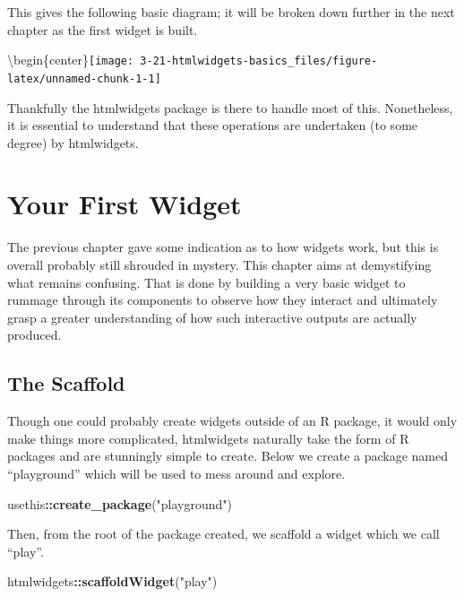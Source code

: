 \documentclass[
]{krantz}
\makeatletter
\newenvironment{Shaded}{\begin{snugshade}}{\end{snugshade}}
\newcommand{\KeywordTok}[1]{\textcolor[rgb]{0.27,0.27,0.27}{\textbf{#1}}}
\newcommand{\NormalTok}[1]{#1}
\newcommand{\OperatorTok}[1]{\textcolor[rgb]{0.43,0.43,0.43}{\textbf{#1}}}
\newcommand{\StringTok}[1]{\textcolor[rgb]{0.5,0.5,0.5}{#1}}
\newenvironment{kframe}{%
\medskip{}
\setlength{\fboxsep}{.8em}
 \def\at@end@of@kframe{}%
 \ifinner\ifhmode%
  \def\at@end@of@kframe{\end{minipage}}%
  \begin{minipage}{\columnwidth}%
 \fi\fi%
 \def\FrameCommand##1{\hskip\@totalleftmargin \hskip-\fboxsep
 \colorbox{shadecolor}{##1}\hskip-\fboxsep
     \hskip-\linewidth \hskip-\@totalleftmargin \hskip\columnwidth}%
 \MakeFramed {\advance\hsize-\width
   \@totalleftmargin\z@ \linewidth\hsize
   \@setminipage}}%
 {\par\unskip\endMakeFramed%
 \at@end@of@kframe}
\renewenvironment{Shaded}{\begin{kframe}}{\end{kframe}}
\makeatother
\begin{document}
This gives the following basic diagram; it will be broken down further in the next chapter as the first widget is built.

\textbackslash begin\{center\}\texttt{[image: 3-21-htmlwidgets-basics\_files/figure-latex/unnamed-chunk-1-1]}

Thankfully the htmlwidgets package is there to handle most of this. Nonetheless, it is essential to understand that these operations are undertaken (to some degree) by htmlwidgets.

\hypertarget{widgets-first}{%
\chapter{Your First Widget}\label{widgets-first}}

The previous chapter gave some indication as to how widgets work, but this is overall probably still shrouded in mystery. This chapter aims at demystifying what remains confusing. That is done by building a very basic widget to rummage through its components to observe how they interact and ultimately grasp a greater understanding of how such interactive outputs are actually produced.

\hypertarget{widgets-first-scaffold}{%
\section{The Scaffold}\label{widgets-first-scaffold}}

Though one could probably create widgets outside of an R package, it would only make things more complicated, htmlwidgets naturally take the form of R packages and are stunningly simple to create. Below we create a package named ``playground'' which will be used to mess around and explore.

\begin{Shaded}
\begin{Highlighting}[]
\NormalTok{usethis}\OperatorTok{::}\KeywordTok{create\_package}\NormalTok{(}\StringTok{"playground"}\NormalTok{)}
\end{Highlighting}
\end{Shaded}

Then, from the root of the package created, we scaffold a widget which we call ``play''.

\begin{Shaded}
\begin{Highlighting}[]
\NormalTok{htmlwidgets}\OperatorTok{::}\KeywordTok{scaffoldWidget}\NormalTok{(}\StringTok{"play"}\NormalTok{)}
\end{Highlighting}
\end{Shaded}
\end{document}
